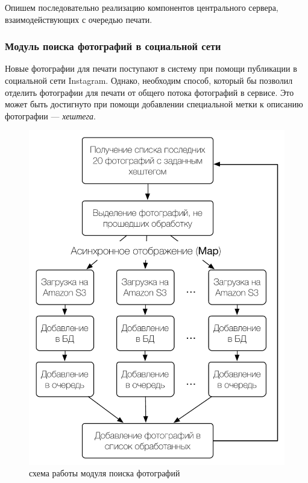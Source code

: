 \documentclass[a4paper,14pt,href]{article}
\begin{document}
Опишем последовательно реализацию компонентов центрального сервера, взаимодействующих с очередью печати.

\subsubsection{Модуль поиска фотографий в социальной сети}
Новые фотографии для печати поступают в систему при помощи публикации в социальной сети Instagram. Однако, необходим
способ, который бы позволил отделить фотографии для печати от общего потока фотографий в сервисе. Это может быть
достигнуто при помощи добавлении специальной метки к описанию фотографии --- \textit{хештега}.

\begin{figure}[htbp]
\begin{center}
  \includegraphics[scale=0.8]{map-reduce.pdf}
    \caption{схема работы модуля поиска фотографий}
    \label{fig:MapReduce}
\end{center}
\end{figure}
\end{document}
